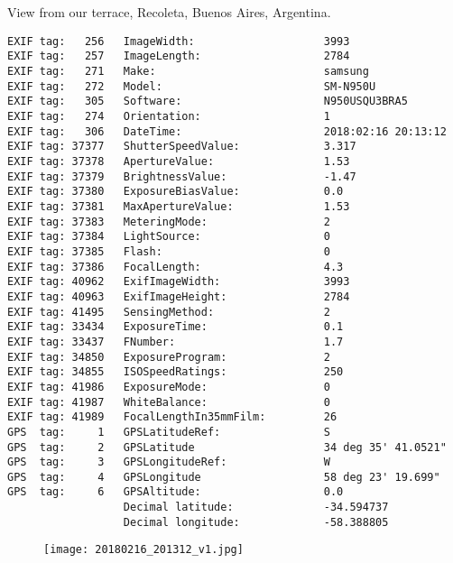 \section{\protect{}}
\noindent View from our terrace, Recoleta, Buenos Aires, Argentina.
\noindent
\begin{lstlisting}
EXIF tag:   256   ImageWidth:                    3993
EXIF tag:   257   ImageLength:                   2784
EXIF tag:   271   Make:                          samsung
EXIF tag:   272   Model:                         SM-N950U
EXIF tag:   305   Software:                      N950USQU3BRA5
EXIF tag:   274   Orientation:                   1
EXIF tag:   306   DateTime:                      2018:02:16 20:13:12
EXIF tag: 37377   ShutterSpeedValue:             3.317
EXIF tag: 37378   ApertureValue:                 1.53
EXIF tag: 37379   BrightnessValue:               -1.47
EXIF tag: 37380   ExposureBiasValue:             0.0
EXIF tag: 37381   MaxApertureValue:              1.53
EXIF tag: 37383   MeteringMode:                  2
EXIF tag: 37384   LightSource:                   0
EXIF tag: 37385   Flash:                         0
EXIF tag: 37386   FocalLength:                   4.3
EXIF tag: 40962   ExifImageWidth:                3993
EXIF tag: 40963   ExifImageHeight:               2784
EXIF tag: 41495   SensingMethod:                 2
EXIF tag: 33434   ExposureTime:                  0.1
EXIF tag: 33437   FNumber:                       1.7
EXIF tag: 34850   ExposureProgram:               2
EXIF tag: 34855   ISOSpeedRatings:               250
EXIF tag: 41986   ExposureMode:                  0
EXIF tag: 41987   WhiteBalance:                  0
EXIF tag: 41989   FocalLengthIn35mmFilm:         26
GPS  tag:     1   GPSLatitudeRef:                S
GPS  tag:     2   GPSLatitude                    34 deg 35' 41.0521"
GPS  tag:     3   GPSLongitudeRef:               W
GPS  tag:     4   GPSLongitude                   58 deg 23' 19.699"
GPS  tag:     6   GPSAltitude:                   0.0
                  Decimal latitude:              -34.594737
                  Decimal longitude:             -58.388805

\end{lstlisting}
\clearpage
\begin{figure}
\raggedleft
\texttt{[image: 20180216\_201312\_v1.jpg]}
\end{figure}


\clearpage
